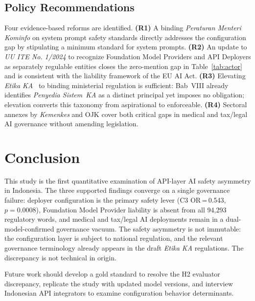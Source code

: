 ﻿\documentclass[conference]{IEEEtran}
\begin{document}
\subsection{Policy Recommendations}

Four evidence-based reforms are identified. \textbf{(R1)} A binding \textit{Peraturan
Menteri Kominfo} on system prompt safety standards directly addresses the configuration gap by stipulating a minimum standard for system prompts. \textbf{(R2)} An update to \textit{UU ITE No. 1/2024} to recognize Foundation Model Providers and API Deployers as separately regulable entities closes the zero-mention gap in Table~\ref{tab:actor} and is consistent with the liability framework of the EU AI Act. \textbf{(R3)} Elevating \textit{Etika KA}~\cite{b16} to binding ministerial regulation is sufficient: Bab~VIII already identifies \textit{Penyedia Sistem~KA} as a distinct principal yet imposes no obligation; elevation converts this taxonomy from aspirational to enforceable. \textbf{(R4)} Sectoral annexes by \textit{Kemenkes} and OJK cover both critical gaps in medical and tax/legal AI governance without amending legislation.

\section{Conclusion}

This study is the first quantitative examination of API-layer AI safety asymmetry in Indonesia. The three supported findings converge on a single governance failure: deployer configuration is the primary safety lever (C3 OR\,=\,0.543, $p\!=\!0.0008$), Foundation Model Provider liability is absent from all 94,293 regulatory words, and medical and tax/legal AI deployments remain in a dual-model-confirmed governance vacuum. The safety asymmetry is not immutable: the configuration layer is subject to national regulation, and the relevant governance terminology already appears in the draft \textit{Etika KA} regulations. The discrepancy is not technical in origin.

Future work should develop a gold standard to resolve the H2 evaluator discrepancy, replicate the study with updated model versions, and interview Indonesian API integrators to examine configuration behavior determinants.

\end{document}
